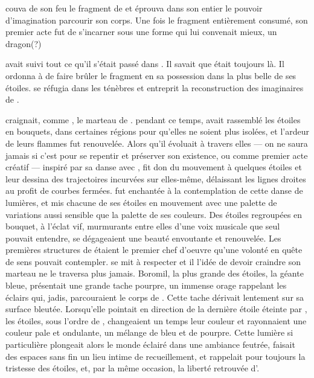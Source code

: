 \Ogo couva de son feu le fragment de \Drisst et éprouva dans son entier le pouvoir d'imagination parcourir son corps. Une fois le fragment entièrement consumé, son premier acte fut de s'incarner sous une forme qui lui convenait mieux, un dragon(?)


\Cind avait suivi tout ce qu'il s'était passé dans \Dreyma. Il savait que \Ogo était toujours là. Il ordonna à \Carac de faire brûler le fragment en sa possession dans la plus belle de ses étoiles. \Shuru se réfugia dans les ténèbres et entreprit la reconstruction des imaginaires de \Mey. 

\Ogo craignait, comme \Shuru, le marteau de \Carac. \Carac pendant ce temps, avait rassemblé les étoiles en bouquets, dans certaines régions pour qu'elles ne soient plus isolées, et l'ardeur de leurs flammes fut renouvelée. Alors qu'il évoluait à travers elles --- on ne saura jamais si c'est pour se repentir et préserver son existence, ou comme premier acte créatif --- inspiré par sa danse avec \Drisst, \Ogo fit don du mouvement à quelques étoiles et leur dessina des trajectoires incurvées sur elles-même, délaissant les lignes droites au profit de courbes fermées. \Carac fut enchantée à la contemplation de cette danse de lumières, et mis chacune de ses étoiles en mouvement avec une palette de variations aussi sensible que la palette de ses couleurs. Des étoiles regroupées en bouquet, à l'éclat vif, murmurants entre elles d'une voix musicale que seul \Carac pouvait entendre, se dégageaient une beauté envoutante et renouvelée. Les premières structures de \Dreyma étaient le premier chef d'oeuvre qu'une volonté en quête de sens pouvait contempler. \Ogo se mit à respecter \Carac et il l'idée de devoir craindre son marteau ne le traversa plus jamais. Boromil, la plus grande des étoiles, la géante bleue, présentait une grande tache pourpre, un immense orage rappelant les éclairs qui, jadis, parcouraient le corps de \Boromu. Cette tache dérivait lentement sur sa surface bleutée. Lorsqu'elle pointait en direction de la dernière étoile éteinte par \Shuru, les étoiles, sous l'ordre de \Carac, changeaient un temps leur couleur et rayonnaient une couleur pale et ondulante, un mélange de bleu et de pourpre. Cette lumière si particulière plongeait alors le monde éclairé dans une ambiance feutrée, faisait des espaces sans fin un lieu intime de recueillement, et rappelait pour toujours la tristesse des étoiles, et, par la même occasion, la liberté retrouvée d'\Ogo.


